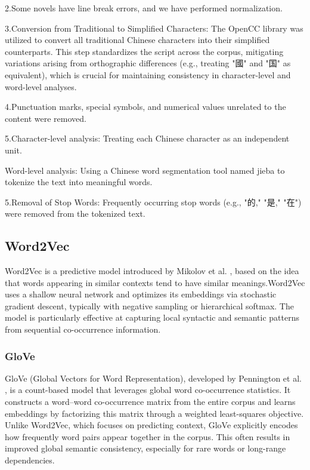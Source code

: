 \documentclass[12pt]{article}
\begin{document}
2.Some novels have line break errors, and we have performed normalization.

3.Conversion from Traditional to Simplified Characters: The OpenCC \cite{yang2020} library was utilized to convert all traditional Chinese characters into their simplified counterparts. This step standardizes the script across the corpus, mitigating variations arising from orthographic differences (e.g., treating "國" and "国" as equivalent), which is crucial for maintaining consistency in character-level and word-level analyses.

4.Punctuation marks, special symbols, and numerical values unrelated to the content were removed.

5.Character-level analysis: Treating each Chinese character as an independent unit.

Word-level analysis: Using a Chinese word segmentation tool named jieba \cite{jieba} to tokenize the text into meaningful words.

5.Removal of Stop Words: Frequently occurring stop words (e.g., "的," "是," "在") were removed from the tokenized text. 

\subsection*{\centering Word2Vec}
Word2Vec is a predictive model introduced by Mikolov et al. \cite{mikolov2013efficient}, based on the idea that words appearing in similar contexts tend to have similar meanings.Word2Vec uses a shallow neural network and optimizes its embeddings via stochastic gradient descent, typically with negative sampling or hierarchical softmax. The model is particularly effective at capturing local syntactic and semantic patterns from sequential co-occurrence information.
\subsubsection*{\centering GloVe}
GloVe (Global Vectors for Word Representation), developed by Pennington et al. \cite{pennington-etal-2014-glove}, is a count-based model that leverages global word co-occurrence statistics. It constructs a word–word co-occurrence matrix from the entire corpus and learns embeddings by factorizing this matrix through a weighted least-squares objective. Unlike Word2Vec, which focuses on predicting context, GloVe explicitly encodes how frequently word pairs appear together in the corpus. This often results in improved global semantic consistency, especially for rare words or long-range dependencies.
\end{document}
